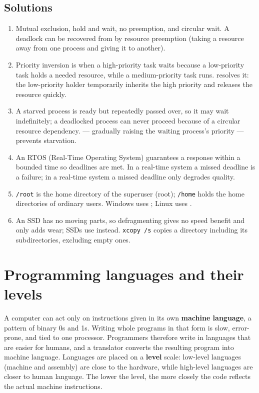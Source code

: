 \subsection*{Solutions}
\begingroup\small
\begin{enumerate}[label=\arabic*.]
  \item Mutual exclusion, hold and wait, no preemption, and circular wait. A
    deadlock can be recovered from by resource preemption (taking a resource
    away from one process and giving it to another).
  \item Priority inversion is when a high-priority task waits because a
    low-priority task holds a needed resource, while a medium-priority task
    runs.  resolves it: the low-priority holder
    temporarily inherits the high priority and releases the resource quickly.
  \item A starved process is ready but repeatedly passed over, so it may wait
    indefinitely; a deadlocked process can never proceed because of a circular
    resource dependency.  --- gradually raising the waiting
    process's priority --- prevents starvation.
  \item An RTOS (Real-Time Operating System) guarantees a response within a
    bounded time so deadlines are met. In a  real-time system a
    missed deadline is a failure; in a  real-time system a missed
    deadline only degrades quality.
  \item \texttt{/root} is the home directory of the superuser (root);
    \texttt{/home} holds the home directories of ordinary users. Windows uses
    ; Linux uses .
  \item An SSD has no moving parts, so defragmenting gives no speed benefit and
    only adds wear; SSDs use  instead. \texttt{xcopy /s} copies a
    directory including its subdirectories, excluding empty ones.
\end{enumerate}
\endgroup

\section{Programming languages and their levels}
A computer can act only on instructions given in its own \textbf{machine
language}, a pattern of binary 0s and 1s. Writing whole programs in that form
is slow, error-prone, and tied to one processor. Programmers therefore write
in languages that are easier for humans, and a translator converts the
resulting program into machine language. Languages are placed on a
\textbf{level} scale: low-level languages (machine and assembly) are close to
the hardware, while high-level languages are closer to human language. The
lower the level, the more closely the code reflects the actual machine
instructions.

